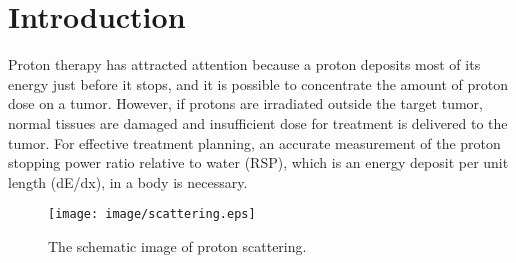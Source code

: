 \documentclass[preprint,3pt]{elsarticle} %
\begin{document}
\linenumbers

\section{Introduction}
	Proton therapy has attracted attention because a proton deposits most of its energy just before it stops, and it is possible to concentrate the amount of proton dose on a tumor. However, if protons are irradiated outside the target tumor, normal tissues are damaged and insufficient dose for treatment is delivered to the tumor. For effective treatment planning, an accurate measurement of the proton stopping power ratio relative to water (RSP), which is an energy deposit per unit length (dE/dx), in a body is necessary.\\
\begin{wrapfigure}{r}{6cm}%
\vspace*{-\intextsep} %
\texttt{[image: image/scattering.eps]}
\caption[The schematic image of proton scattering.]{The schematic image of proton scattering.}
\label{scatter}
\end{wrapfigure} 
\end{document}

